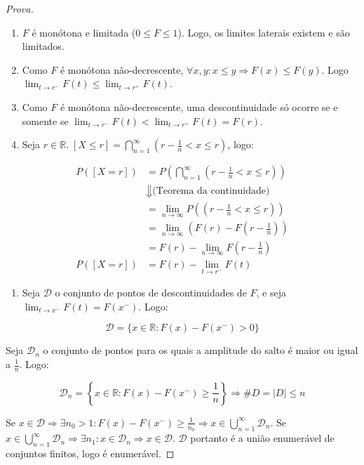 \documentclass[
]{article}
\providecommand{\tightlist}{%
  \setlength{\itemsep}{0pt}\setlength{\parskip}{0pt}}
\theoremstyle{definition}
\theoremstyle{definition}
\theoremstyle{definition}
\theoremstyle{definition}
\theoremstyle{remark}
\begin{document}
\begin{proof}[Prova]
\leavevmode

\begin{enumerate}
\def\labelenumi{\alph{enumi})}
\item
  \(F\) é monótona e limitada (\(0 \le F \le 1\)). Logo, os limites laterais existem e são limitados.
\item
  Como \(F\) é monótona não-decrescente, \(\forall x,y : x \le y \Rightarrow F(x) \le F(y)\). Logo \(\lim_{t \to r^{-}}F(t) \le \lim_{t \to r^{+}}F(t)\).
\item
  Como \(F\) é monótona não-decrescente, uma descontinuidade só ocorre se e somente se \(\lim_{t \to r^{-}}F(t) < \lim_{t \to r^{+}}F(t) = F(r)\).
\item
  Seja \(r \in \mathbb{R}. \; [X \le r] = \bigcap_{n=1}^{\infty}(r-\frac{1}{n} < x \le r)\), logo:
\end{enumerate}

\begin{align*}
P([X = r]) &= P\left(\bigcap_{n=1}^{\infty}\left(r-\frac{1}{n} < x \le r\right)\right) \\
&\Downarrow \text{(Teorema da continuidade)} \\
&=\lim_{n \to \infty}P\left(\left(r - \frac{1}{n} < x \le r\right)\right) \\
&= \lim_{n \to \infty} \left(F(r) - F\left(r - \frac{1}{n}\right)\right) \\
&= F(r) - \lim_{n \to \infty}F\left(r - \frac{1}{n}\right) \\
P([X = r]) &= F(r) - \lim_{t \to r^{-}}F(t)
\end{align*}

\begin{enumerate}
\def\labelenumi{\alph{enumi})}
\setcounter{enumi}{4}
\tightlist
\item
  Seja \(\mathcal{D}\) o conjunto de pontos de descontinuidades de \(F\), e seja \(\lim_{t \to x^{-}}F(t) = F(x^{-})\). Logo:
\end{enumerate}

\begin{equation*}
\mathcal{D} = \{x \in \mathbb{R} : F(x) - F(x^{-}) > 0\}
\end{equation*}

Seja \(\mathcal{D}_{n}\) o conjunto de pontos para os quais a amplitude do salto é maior ou igual a \(\frac{1}{n}\). Logo:

\begin{equation*}
\mathcal{D}_{n} = \left\{x \in \mathbb{R}: F(x) - F(x^{-}) \ge \frac{1}{n}\right\} \Rightarrow \# D = |D| \le n
\end{equation*}

Se \(x \in \mathcal{D} \Rightarrow \exists n_{0} > 1 : F(x) - F(x^{-}) \ge \frac{1}{n_{0}} \Rightarrow x \in \bigcup_{n=1}^{\infty}\mathcal{D}_{n}\). Se \(x \in \bigcup_{n=1}^{\infty}\mathcal{D}_{n} \Rightarrow \exists n_{1} : x \in \mathcal{D}_{n} \Rightarrow x \in \mathcal{D}\). \(\mathcal{D}\) portanto é a união enumerável de conjuntos finitos, logo é enumerável.

\end{proof}
\end{document}
